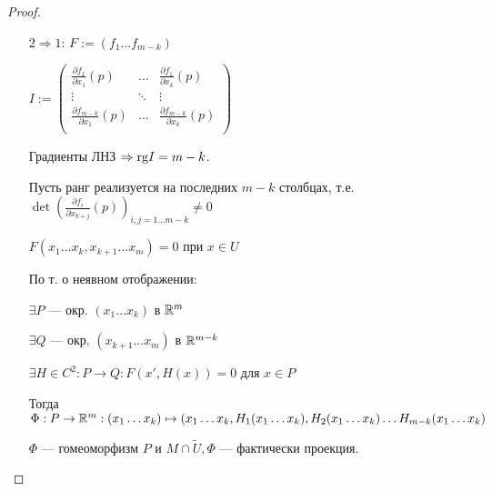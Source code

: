 \begin{proof}
\begin{itemize}
        \item [$2 \Rightarrow 1$:] $F := (f_1\ldots f_{m-k})$

              $I := \begin{pmatrix}
                      \frac{\partial f_1}{\partial x_1}(p)     & \ldots & \frac{\partial f_1}{\partial x_k}(p)     \\
                      \vdots                                   & \ddots & \vdots                                   \\
                      \frac{\partial f_{m-k}}{\partial x_1}(p) & \ldots & \frac{\partial f_{m-k}}{\partial x_k}(p) \\
                  \end{pmatrix}$

              Градиенты ЛНЗ $\Rightarrow \text{rg} I = m-k$.

              Пусть ранг реализуется на последних $m-k$ столбцах, т.е. $\det\left(\frac{\partial f_i}{\partial x_{k+j}} (p)\right)_{i, j = 1\ldots m-k} \not = 0$

              $F(x_1\ldots x_k, x_{k+1}\ldots x_m) = 0$ при $x\in U$

              По т. о неявном отображении:

              $\exists P$ --- окр. $(x_1\ldots x_k)$ в $\mathbb{R}^m$

              $\exists Q$ --- окр. $(x_{k+1}\ldots x_m)$ в $\mathbb{R}^{m-k}$

              $\exists H\in C^2 : P\to Q : F(x', H(x)) = 0$ для $x\in P$

              Тогда $\Phi : P\to\mathbb{R}^m : (x_1\ldots x_k)\mapsto(x_1\ldots x_k, H_1(x_1\ldots x_k), H_2(x_1\ldots x_k) \ldots H_{m-k}(x_1\ldots x_k)$

              $\Phi$ --- гомеоморфизм $P$ и $M \cap \tilde U, \Phi$ --- фактически проекция.

    \end{itemize}
\end{proof}

